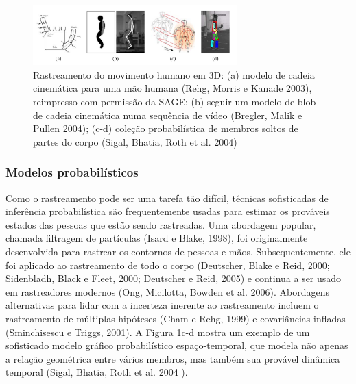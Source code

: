 \documentclass{article}
\begin{document}
\begin{figure}[!htb]
    \centering
    \includegraphics[width=0.7\textwidth]{img8.png}
    \caption{Rastreamento do movimento humano em 3D: (a) modelo de cadeia cinemática para uma mão humana (Rehg, Morris e Kanade 2003), reimpresso com permissão da SAGE; (b) seguir um modelo de blob de cadeia cinemática numa sequência de vídeo (Bregler, Malik e Pullen 2004); (c-d) coleção probabilística de membros soltos de partes do corpo (Sigal, Bhatia, Roth et al. 2004)
}
    \label{fig:img7}
\end{figure}

\subsubsection{Modelos probabilísticos}
Como o rastreamento pode ser uma tarefa tão difícil, técnicas sofisticadas de inferência probabilística são frequentemente usadas para estimar os prováveis estados das pessoas que estão sendo rastreadas. Uma abordagem popular, chamada filtragem de partículas (Isard e Blake, 1998), foi originalmente desenvolvida para rastrear os contornos de pessoas e mãos. Subsequentemente, ele foi aplicado ao rastreamento de todo o corpo (Deutscher, Blake e Reid, 2000; Sidenbladh, Black e Fleet, 2000; Deutscher e Reid, 2005) e continua a ser usado em rastreadores modernos (Ong, Micilotta, Bowden et al. 2006). Abordagens alternativas para lidar com a incerteza inerente ao rastreamento incluem o rastreamento de múltiplas hipóteses (Cham e Rehg, 1999) e covariâncias infladas (Sminchisescu e Triggs, 2001). A Figura \ref{fig:img7}c-d mostra um exemplo de um sofisticado modelo gráfico probabilístico espaço-temporal, que modela não apenas a relação geométrica entre vários membros, mas também sua provável dinâmica temporal (Sigal, Bhatia, Roth et al. 2004 ).
\end{document}
